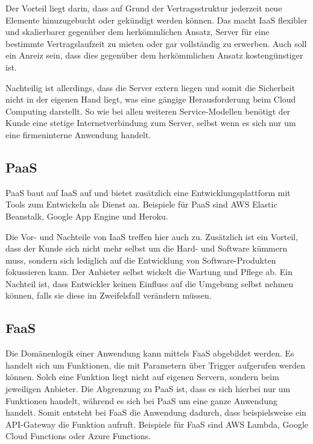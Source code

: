Der Vorteil liegt darin, dass auf Grund der Vertragsstruktur jederzeit neue Elemente hinuzugebucht oder gekündigt werden können. Das macht \acl{IaaS} flexibler und skalierbarer gegenüber dem herkömmlichen Ansatz, Server für eine bestimmte Vertragslaufzeit zu mieten oder gar vollständig zu erwerben. Auch soll ein Anreiz sein, dass dies gegenüber dem herkömmlichen Ansatz kostengünstiger ist.

Nachteilig ist allerdings, dass die Server extern liegen und somit die Sicherheit nicht in der eigenen Hand liegt, was eine gängige Herausforderung beim Cloud Computing darstellt. So wie bei allen weiteren Service-Modellen benötigt der Kunde eine stetige Internetverbindung zum Server, selbst wenn es sich nur um eine firmeninterne Anwendung handelt.

\subsection{\acl{PaaS}}

\acf{PaaS} baut auf \acl{IaaS} auf und bietet zusätzlich eine Entwicklungsplattform mit Tools zum Entwickeln als Dienst an. Beispiele für \ac{PaaS} sind \ac{AWS} Elastic Beanstalk, Google App Engine und Heroku.

Die Vor- und Nachteile von \acl{IaaS} treffen hier auch zu. Zusätzlich ist ein Vorteil, dass der Kunde sich nicht mehr selbst um die Hard- und Software kümmern muss, sondern sich lediglich auf die Entwicklung von Software-Produkten fokussieren kann. Der Anbieter selbst wickelt die Wartung und Pflege ab. Ein Nachteil ist, dass Entwickler keinen Einfluss auf die Umgebung selbst nehmen können, falls sie diese im Zweifelsfall verändern müssen.

\subsection{\acl{FaaS}}

Die Domänenlogik einer Anwendung kann mittels \acf{FaaS} abgebildet werden. Es handelt sich um Funktionen, die mit Parametern über Trigger aufgerufen werden können. Solch eine Funktion liegt nicht auf eigenen Servern, sondern beim jeweiligen Anbieter. Die Abgrenzung zu \ac{PaaS} ist, dass es sich hierbei nur um Funktionen handelt, während es sich bei \ac{PaaS} um eine ganze Anwendung handelt. Somit entsteht bei \ac{FaaS} die Anwendung dadurch, dass beispielsweise ein API-Gateway die Funktion aufruft. Beispiele für \ac{FaaS} sind \ac{AWS} Lambda, Google Cloud Functions oder Azure Functions.

